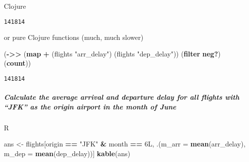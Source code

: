 \documentclass[]{article}
\newenvironment{Shaded}{\begin{snugshade}}{\end{snugshade}}
\newcommand{\DataTypeTok}[1]{\textcolor[rgb]{0.13,0.29,0.53}{#1}}
\newcommand{\FloatTok}[1]{\textcolor[rgb]{0.00,0.00,0.81}{#1}}
\newcommand{\KeywordTok}[1]{\textcolor[rgb]{0.13,0.29,0.53}{\textbf{#1}}}
\newcommand{\NormalTok}[1]{#1}
\newcommand{\OperatorTok}[1]{\textcolor[rgb]{0.81,0.36,0.00}{\textbf{#1}}}
\newcommand{\StringTok}[1]{\textcolor[rgb]{0.31,0.60,0.02}{#1}}
\newcommand{\VariableTok}[1]{\textcolor[rgb]{0.00,0.00,0.00}{#1}}
\let\oldsubparagraph\subparagraph
\renewcommand{\subparagraph}[1]{\oldsubparagraph{#1}\mbox{}}
\begin{document}
Clojure

\begin{Shaded}
\end{Shaded}

\begin{verbatim}
141814
\end{verbatim}

or pure Clojure functions (much, much slower)

\begin{Shaded}
\begin{Highlighting}[]
\NormalTok{(}\KeywordTok{->>}\NormalTok{ (}\KeywordTok{map} \KeywordTok{+}\NormalTok{ (flights }\StringTok{"arr_delay"}\NormalTok{) (flights }\StringTok{"dep_delay"}\NormalTok{))}
\NormalTok{     (}\KeywordTok{filter} \KeywordTok{neg?}\NormalTok{)}
\NormalTok{     (}\KeywordTok{count}\NormalTok{))}
\end{Highlighting}
\end{Shaded}

\begin{verbatim}
141814
\end{verbatim}

\hypertarget{calculate-the-average-arrival-and-departure-delay-for-all-flights-with-jfk-as-the-origin-airport-in-the-month-of-june}{%
\subparagraph{Calculate the average arrival and departure delay for all
flights with ``JFK'' as the origin airport in the month of
June}\label{calculate-the-average-arrival-and-departure-delay-for-all-flights-with-jfk-as-the-origin-airport-in-the-month-of-june}}

R

\begin{Shaded}
\begin{Highlighting}[]
\NormalTok{ans <-}\StringTok{ }\NormalTok{flights[origin }\OperatorTok{==}\StringTok{ "JFK"} \OperatorTok{&}\StringTok{ }\NormalTok{month }\OperatorTok{==}\StringTok{ }\NormalTok{6L,}
\NormalTok{               .(}\DataTypeTok{m_arr =} \KeywordTok{mean}\NormalTok{(arr_delay), }\DataTypeTok{m_dep =} \KeywordTok{mean}\NormalTok{(dep_delay))]}
\KeywordTok{kable}\NormalTok{(ans)}
\end{Highlighting}
\end{Shaded}
\end{document}
